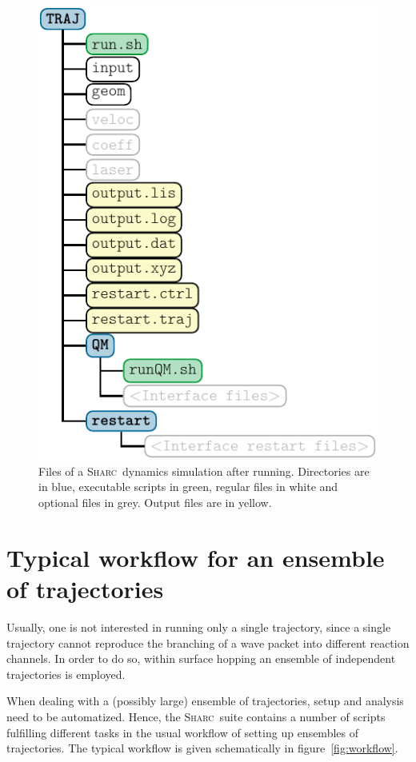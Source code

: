 \documentclass[a4paper,10pt,DIV=15,openany]{scrbook}
\newcommand{\sharc}{\textsc{Sharc}}
\begin{document}
\begin{figure}[htb]
  \centering
  \includegraphics[scale=1]{img/dir_traj/dir_traj_after.pdf}
  \caption[Files of a \sharc\ dynamics simulation after running.]{Files of a \sharc\ dynamics simulation after running. Directories are in blue, executable scripts in green, regular files in white and optional files in grey. Output files are in yellow.}
  \label{fig:dir_traj_after}
\end{figure}




\section{Typical workflow for an ensemble of trajectories}
\label{sec:typical_workflow}

Usually, one is not interested in running only a single trajectory, since a single trajectory cannot reproduce the branching of a wave packet into different reaction channels. In order to do so, within surface hopping an ensemble of independent trajectories is employed. 

When dealing with a (possibly large) ensemble of trajectories, setup and analysis need to be automatized. Hence, the \sharc\ suite contains a number of scripts fulfilling different tasks in the usual workflow of setting up ensembles of trajectories.
The typical workflow is given schematically in figure~\ref{fig:workflow}.
\end{document}
